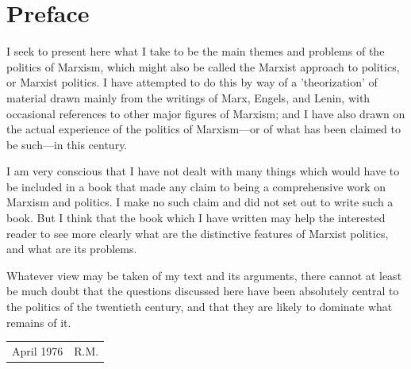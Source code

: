 \chapter*{Preface}
I seek to present here what I take to be the main themes and problems of the politics of Marxism, which might also be called the Marxist approach to politics, or Marxist politics. I have attempted to do this by way of a 'theorization' of material drawn mainly from the writings of Marx, Engels, and Lenin, with occasional references to other major figures of Marxism; and I have also drawn on the actual experience of the politics of Marxism—or of what has been claimed to be such—in this century.

I am very conscious that I have not dealt with many things which would have to be included in a book that made any claim to being a comprehensive work on Marxism and politics. I make no such claim and did not set out to write such a book. But I think that the book which I have written may help the interested reader to see more clearly what are the distinctive features of Marxist politics, and what are its problems.

Whatever view may be taken of my text and its arguments, there cannot at least be much doubt that the questions discussed here have been absolutely central to the politics of the twentieth century, and that they are likely to dominate what remains of it.


\begin{tabularx}{1\textwidth}{ 
  >{\raggedright\arraybackslash}X 
  >{\centering\arraybackslash}X }
    April 1976 &  R.M. \\
\end{tabularx}
